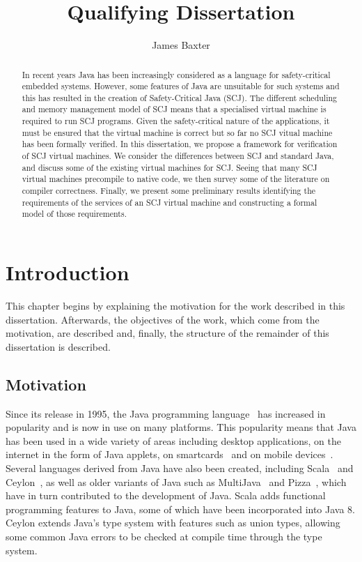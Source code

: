 \documentclass[a4paper,10pt]{report}
\title{Qualifying Dissertation}
\author{James Baxter}
\date{}
\begin{document}
\maketitle

\begin{abstract}
  In recent years Java has been increasingly considered as a language for
  safety-critical embedded systems.  However, some features of Java are
  unsuitable for such systems and this has resulted in the creation of
  Safety-Critical Java (SCJ).  The different scheduling and memory management
  model of SCJ means that a specialised virtual machine is required to run SCJ
  programs.  Given the safety-critical nature of the applications, it must be
  ensured that the virtual machine is correct but so far no SCJ vitual machine
  has been formally verified.  In this dissertation, we propose a framework for
  verification of SCJ virtual machines.  We consider the differences between SCJ
  and standard Java, and discuss some of the existing virtual machines for SCJ.
  Seeing that many SCJ virtual machines precompile to native code, we then
  survey some of the literature on compiler correctness.  Finally, we present
  some preliminary results identifying the requirements of the services of an
  SCJ virtual machine and constructing a formal model of those requirements.
\end{abstract}

\tableofcontents

\chapter{Introduction}

This chapter begins by explaining the motivation for the work described in this
dissertation. Afterwards, the objectives of the work, which come from the
motivation, are described and, finally, the structure of the remainder of this
dissertation is described.

\section{Motivation}

Since its release in 1995, the Java programming language~\cite{gosling2013} has
increased in popularity and is now in use on many platforms.  This popularity
means that Java has been used in a wide variety of areas including desktop
applications, on the internet in the form of Java applets, on
smartcards~\cite{chen2000} and on mobile devices~\cite{oracle2014}.  Several
languages derived from Java have also been created, including
Scala~\cite{lausanne2015} and Ceylon~\cite{redhat2015}, as well as older
variants of Java such as MultiJava~\cite{clifton2006} and
Pizza~\cite{odersky1997}, which have in turn contributed to the development of
Java. Scala adds functional programming features to Java, some of which have
been incorporated into Java 8. Ceylon extends Java's type system with features
such as union types, allowing some common Java errors to be checked at compile
time through the type system.
\end{document}

